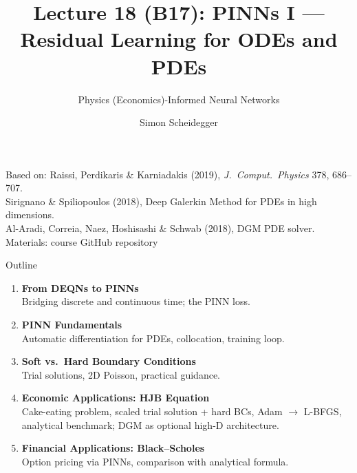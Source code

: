 \documentclass[aspectratio=169,11pt]{beamer}
\title[Lecture 18 (B17)]{Lecture 18 (B17): PINNs I --- Residual Learning for ODEs and PDEs}
\subtitle{Physics (Economics)-Informed Neural Networks}
\author{Simon Scheidegger}
\institute{HEC, University of Lausanne}
\date{}
\begin{document}
\newcommand{\exercisepause}{%
  \tikz[baseline=(X.base)]{\node[fill=darkgreen!80!black, text=white,
  rounded corners=2pt, inner sep=3pt, font=\scriptsize\bfseries](X){PAUSE --- 5 min};}}



{
\begin{frame}
\titlepage
\vspace{-0.6cm}
\begin{center}
\begingroup\sloppy{}
{\scriptsize Based on: Raissi, Perdikaris \& Karniadakis (2019), \emph{J.\ Comput.\ Physics} 378, 686--707.}\\[1pt]
{\scriptsize Sirignano \& Spiliopoulos (2018), Deep Galerkin Method for PDEs in high dimensions.}\\[1pt]
{\scriptsize Al-Aradi, Correia, Naez, Hoshisashi \& Schwab (2018), DGM PDE solver.}\\[2pt]
{\scriptsize Materials: course GitHub repository}
\endgroup
\end{center}
\end{frame}
}

\begin{frame}{Outline}
\begin{enumerate}
    \item \textbf{From DEQNs to PINNs}\\
    {\small Bridging discrete and continuous time; the PINN loss.}

    \vspace{0.4em}
    \item \textbf{PINN Fundamentals}\\
    {\small Automatic differentiation for PDEs, collocation, training loop.}

    \vspace{0.4em}
    \item \textbf{Soft vs.\ Hard Boundary Conditions}\\
    {\small Trial solutions, 2D Poisson, practical guidance.}

    \vspace{0.4em}
    \item \textbf{Economic Applications: HJB Equation}\\
    {\small Cake-eating problem, scaled trial solution + hard BCs, Adam $\to$ L-BFGS, analytical benchmark; DGM as optional high-D architecture.}

    \vspace{0.4em}
    \item \textbf{Financial Applications: Black--Scholes}\\
    {\small Option pricing via PINNs, comparison with analytical formula.}
\end{enumerate}
\end{frame}
\end{document}
